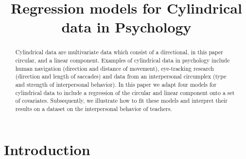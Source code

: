 \documentclass[12pt,]{article}
\title{Regression models for Cylindrical data in Psychology}
\author{}
\date{}
\begin{document}
\maketitle
\begin{abstract}
Cylindrical data are multivariate data which consist of a directional,
in this paper circular, and a linear component. Examples of cylindrical
data in psychology include human navigation (direction and distance of
movement), eye-tracking research (direction and length of saccades) and
data from an interpersonal circumplex (type and strength of
interpersonal behavior). In this paper we adapt four models for
cylindrical data to include a regression of the circular and linear
component onto a set of covariates. Subsequently, we illustrate how to
fit these models and interpret their results on a dataset on the
interpersonal behavior of teachers.
\end{abstract}

\section{Introduction}\label{Introduction}
\end{document}
